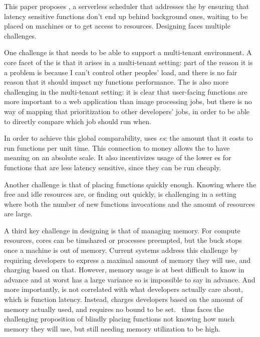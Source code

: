This paper proposes \sys{}, a serverless scheduler that addresses the \problem{}
by ensuring that latency sensitive functions don't end up behind background
ones, waiting to be placed on machines or to get access to resources. Designing
\sys{} faces multiple challenges. 

One challenge is that \sys{} needs to be able to support a multi-tenant
environment. A core facet of the \problem{} is that it arises in a multi-tenant
setting: part of the reason it is a problem is because I can't control other
peoples' load, and there is no fair reason that it should impact my functions
performance. The \problem{} is also more challenging in the
multi-tenant setting: it is clear that user-facing functions are more important
to a web application than image processing jobs, but there is no way of mapping
that prioritization to other developers' jobs, in order to be able to directly
compare which job should run when. 


In order to achieve this global comparability, \sys{} uses
\emph{\priceclass{}es}: the amount that it costs to run functions per unit time.
This connection to money allows the \class{} to have meaning on an absolute
scale. It also incentivizes usage of the lower \class{}es for functions that are
less latency sensitive, since they can be run cheaply.


Another challenge is that of placing functions quickly enough. Knowing where the
free and idle resources are, or finding out quickly, is challenging in a setting
where both the number of new functions invocations and the amount of resources
are large.


A third key challenge in designing \sys{} is that of managing memory. For
compute resources, cores can be timshared or processes preempted, but the buck
stops once a machine is out of memory. Current systems address this challenge by
requiring developers to express a maximal amount of memory they will use, and
charging based on that. However, memory usage is at best difficult to know in
advance and at worst has a large variance so is impossible to say in advance.
And more importantly, is not correlated with what developers actually care
about, which is function latency. Instead, \sys{} charges developers based on
the amount of memory actually used, and requires no bound to be set.~\Sys{} thus
faces the challenging proposition of blindly placing functions not knowing how
much memory they will use, but still needing memory utilization to be high.
 
